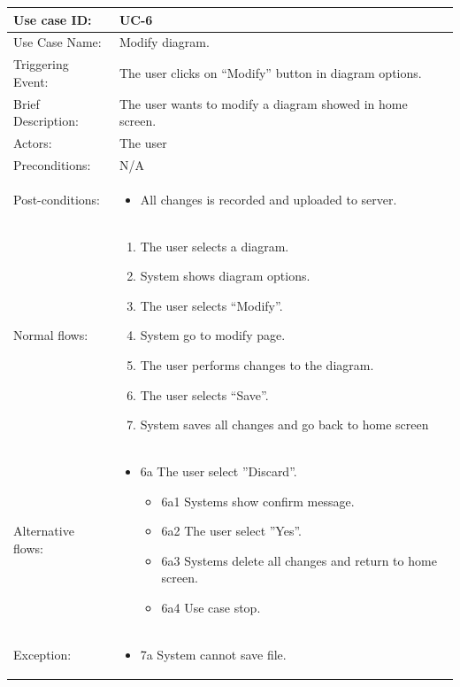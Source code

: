\begin{table}[]
\begin{tabular}{| m{4cm} | m{11cm} |}
\hline
Use case ID:       & UC-6 \\ \hline
Use Case Name:     & Modify diagram. \\ \hline
Triggering Event:  & The user clicks on “Modify” button in diagram options. \\ \hline
Brief Description: & The user wants to modify a diagram showed in home screen. \\ \hline
Actors:            & The user \\ \hline
Preconditions:     & N/A\\ \hline
Post-conditions:   & \begin{itemize}
    \item All changes is recorded and uploaded to server.
\end{itemize} \\ \hline
Normal flows:      & \begin{enumerate}
    \item The user selects a diagram.
    \item System shows diagram options.
    \item The user selects “Modify”.
    \item System go to modify page.
    \item The user performs changes to the diagram.
    \item The user selects “Save”.
    \item System saves all changes and go back to home screen
\end{enumerate} \\ \hline
Alternative flows: & \begin{itemize}
    \item {6a The user select ''Discard''.}
    \begin{itemize}
        \item 6a1 Systems show confirm message.
        \item 6a2 The user select ''Yes''.
        \item 6a3 Systems delete all changes and return to home screen.
        \item 6a4 Use case stop.
    \end{itemize}
\end{itemize} \\ \hline
Exception: & \begin{itemize}
    \item {7a System cannot save file.}

\end{itemize}
\end{tabular}
\end{table}
